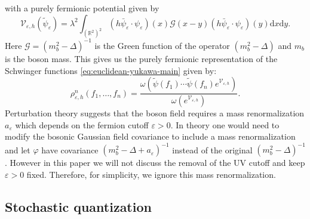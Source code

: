 \documentclass{article}
\newcommand{\mathd}{\mathrm{d}}
\begin{document}
with a purely fermionic potential given by
\begin{equation}
  \mathcal{V}_{\varepsilon, h} (\tilde{\psi}_{\varepsilon}) = \lambda^2
  \int_{(\mathbb{R}^2)^2} (h \bar{\psi}_{\varepsilon} \cdot
  \psi_{\varepsilon}) (x) \mathcal{G} (x - y) (h \bar{\psi}_{\varepsilon}
  \cdot \psi_{\varepsilon}) (y) \mathd x \mathd y. \label{eq:effectiveV}
\end{equation}
Here $\mathcal{G} = (m^2_b - \Delta)^{- 1}$ is the Green function of the
operator $(m^2_b - \Delta)$ and $m_b$ is the boson mass. This gives us the
purely fermionic representation of the Schwinger functions
{\eqref{eq:euclidean-yukawa-main}} given by:
\begin{equation}
  \rho^n_{\varepsilon, h} (f_1, \ldots, f_n) = \frac{\omega (\tilde{\psi}
  (f_1) \cdots \tilde{\psi} (f_n) e^{\mathcal{V}_{\varepsilon, h}})}{\omega
  (e^{\mathcal{V}_{\varepsilon, h}})} . \label{eq:euclidean-yukawa-fermion}
\end{equation}
Perturbation theory suggests that the boson field requires a mass
renormalization $a_{\varepsilon}$ which depends on the fermion cutoff
$\varepsilon > 0$. In theory one would need to modify the bosonic Gaussian
field covariance to include a mass renormalization and let $\varphi$ have
covariance $(m^2_b - \Delta + a_{\varepsilon})^{- 1}$ instead of the original
$(m^2_b - \Delta)^{- 1}$. However in this paper we will not discuss the
removal of the UV cutoff and keep $\varepsilon > 0$ fixed. Therefore, for
simplicity, we ignore this mass renormalization.

\subsection{Stochastic quantization}\label{sec:yukawa-sq}
\end{document}
